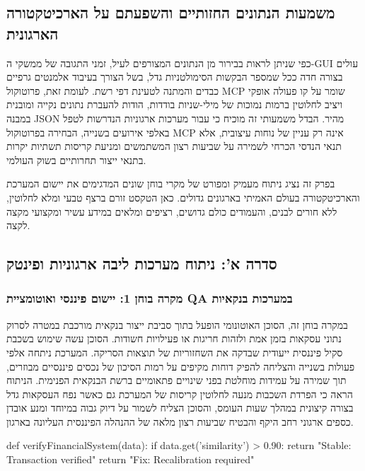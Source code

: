\documentclass{hebrew-academic-template}
\begin{document}
\subsection{משמעות הנתונים החזותיים והשפעתם על הארכיטקטורה הארגונית}
כפי שניתן לראות בבירור מן הנתונים המצורפים לעיל, זמני התגובה של ממשקי ה-GUI עולים בצורה חדה ככל שמספר הבקשות הסימולטניות גדל, בשל הצורך בעיבוד אלמנטים גרפיים כבדים והמתנה לטעינת דפי רשת. לעומת זאת, פרוטוקול MCP שומר על קו פעולה אופקי ויציב לחלוטין ברמות נמוכות של מילי-שניות בודדות, הודות להעברת נתונים נקייה ומובנית במבנה JSON מהיר. הבדל משמעותי זה מוכיח כי עבור מערכות ארגוניות הנדרשות לטפל באלפי אירועים בשנייה, הבחירה בפרוטוקול MCP אינה רק עניין של נוחות עיצובית, אלא תנאי הנדסי הכרחי לשמירה על שביעות רצון המשתמשים ומניעת קריסות תשתיות יקרות בתנאי ייצור תחרותיים בשוק העולמי.

בפרק זה נציג ניתוח מעמיק ומפורט של מקרי בוחן שונים המדגימים את יישום המערכת והארכיטקטורה בעולם האמיתי בארגונים גדולים. כאן הטקסט זורם ברצף טבעי ומלא לחלוטין, ללא חורים לבנים, והעמודים כולם גדושים, רציפים ומלאים במידע עשיר ומקצועי מקצה לקצה.

\subsection{סדרה א': ניתוח מערכות ליבה ארגוניות ופינטק}

\subsubsection{מקרה בוחן 1: יישום פיננסי ואוטומציית QA במערכות בנקאיות}
במקרה בוחן זה, הסוכן האוטונומי הופעל בתוך סביבת ייצור בנקאית מורכבת במטרה לסרוק נתוני עסקאות בזמן אמת ולזהות חריגות או פעילויות חשודות. הסוכן עשה שימוש בשכבת סקיל פיננסית ייעודית שבדקה את השחזוריות של תוצאות הסריקה. המערכת ניתחה אלפי פעולות בשנייה והצליחה להפיק דוחות מקיפים על רמות הסיכון של נכסים פיננסיים מבוזרים, תוך שמירה על עמידות מוחלטת בפני שינויים פתאומיים ברשת הבנקאית הפנימית. הניתוח הראה כי הפרדת השכבות מנעה לחלוטין קריסות של המערכת גם כאשר נפח העסקאות גדל בצורה קיצונית במהלך שעות העומס, והסוכן הצליח לשמור על דיוק גבוה במיוחד ומנע אובדן כספים ארגוני רחב היקף והבטיח שביעות רצון מלאה של ההנהלה הפיננסית העליונה בארגון.
\begin{pythonbox}
def verifyFinancialSystem(data):
    if data.get('similarity') > 0.90:
        return "Stable: Transaction verified"
    return "Fix: Recalibration required"
\end{pythonbox}
\end{document}
